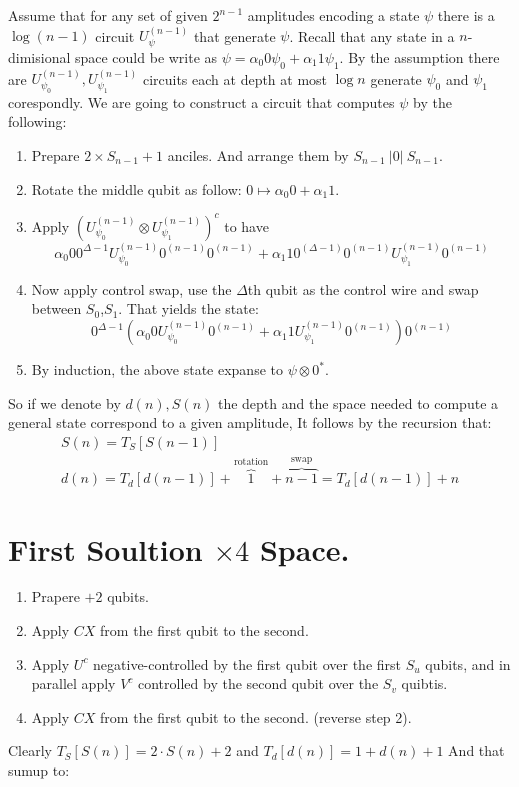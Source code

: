 \documentclass[manuscript,screen,review]{acmart}
\begin{document}
Assume that for any set of given $2^{n-1}$ amplitudes encoding a state $\psi$ there is a $\log(n-1)$ circuit $U_{\psi}^{(n-1)}$ that generate $\psi$. Recall that any state in a $n$-dimisional space could be write as $\psi = \alpha_{0} 0 \psi_{0} + \alpha_{1} 1 \psi_{1} $. By the assumption there are $U_{\psi_{0}}^{(n-1)},U_{\psi_{1}}^{(n-1)}$ circuits each at depth at most $\log n$ generate $\psi_{0}$ and $\psi_{1}$ corespondly. We are going to construct a circuit that computes $\psi$ by the following: 
\begin{enumerate}
  \item Prepare $2 \times S_{n-1} + 1$ anciles. And arrange them by $S_{n-1} \ |0| \ S_{n-1}$. 
  \item Rotate the middle qubit as follow: $ 0 \mapsto \alpha_{0} 0 + \alpha_{1} 1 $.   
  \item Apply $\left(U_{\psi_{0}}^{(n-1)} \otimes U_{\psi_{1}}^{(n-1)}\right)^{c} $ to have $$\alpha_{0} 0 0^{\Delta -1} U_{\psi_{0}}^{(n-1)} 0^{(n-1)} 0^{(n-1)} + \alpha_{1} 1 0^{(\Delta - 1)}0^{(n-1)}U_{\psi_{1}}^{(n-1)}0^{(n-1)}$$
  \item Now apply control swap, use the $\Delta$th qubit as the control wire and swap between $S_{0}$,$S_{1}$. That yields the state: 
$$ 0^{\Delta -1} \left(\alpha_{0} 0 U_{\psi_{0}}^{(n-1)} 0^{(n-1)} + \alpha_{1} 1 U_{\psi_{1}}^{(n-1)}0^{(n-1)} \right)0^{(n-1)} $$
\item By induction, the above state expanse to $\psi \otimes 0^{*}$.
\end{enumerate}
So if we denote by $d(n), S(n)$ the depth and the space needed to compute a general state correspond to a given amplitude, It follows by the recursion that: 
$$ \begin{split} & S(n) = T_{S}[S(n-1)]  &  \\ & d(n) = T_{d}[d(n-1)] + \overbrace{1}^{ \text{rotation} } + \overbrace{n-1}^{\text{swap}} =  T_{d}[d(n-1)] + n   \end{split} $$     



\section{First Soultion $\times 4$ Space.}

\begin{enumerate}
  \item Prapere $+2$ qubits.
  \item Apply $CX$ from the first qubit to the second.
  \item Apply $U^{c}$ negative-controlled by the first qubit over the first $S_{u}$ qubits, and in parallel apply $V^{c}$ controlled by the second qubit over the $S_{v}$ quibtis.   
  \item Apply $CX$ from the first qubit to the second. (reverse step 2).
\end{enumerate}
Clearly $T_{S}[S(n)] = 2 \cdot S(n) + 2$ and $T_{d}[d(n)] = 1 + d(n) + 1$ And that sumup to:
\end{document}

